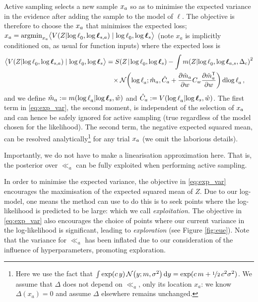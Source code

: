 \documentclass{article} %
\begin{document}
Active sampling selects a new sample $\lfv_a$ so as to minimise the expected variance in the evidence after adding the sample to the model of $\ell$.  The objective is therefore to choose the $\lfv_a$ that minimises the expected loss;
$\lfv_a = \argmin_{\lfv_a} \bigl\langle \cov{\If}{\ll_0,\tvr_{s,a}}\mid \ll_0,\tvr_{s}\bigr\rangle 
$
(note $x_a$ is implicitly conditioned on, as usual for function inputs) where the expected loss is
\begin{align}
\bigl\langle \cov{\If}{\ll_0,\tvr_{s,a}}\mid \ll_0,\tvr_{s}\bigr\rangle 
 & = \secm{\If}{\ll_0,\tvr_s} 
 - \int\mean{\If}{\ll_0,\tvr_{a,s},\Delta_c}^2\nonumber\\
& \hspace{0.3cm}
\times\N{\ll_a}
{\hat{m}_a }
{\hat{C}_a +\pderiv{\hat{m}_a}{w}C_w\pderiv{\hat{m}\tra_a}{w}}
\ud\ll_a\,,\label{eq:exp_var}
\end{align}
and we define
$\hat{m}_a \deq \mean{\ll_a}{\tvr_s,\hat{w}}$
and
$\hat{C}_a \deq \cov{\ll_a}{\tvr_s,\hat{w}}$.
The first term in \eqref{eq:exp_var}, the second moment, is independent of the selection of $\lfv_a$ and can hence  be safely ignored for active sampling (true regardless of the model chosen for the likelihood). 
The second term, the negative expected squared mean, can be resolved analytically\footnote{Here we use the fact that $\int \exp(c\, y)\, \N{y}{m}{\sigma^2} \ud y = \exp(c\, m + \nicefrac{1}{2}\, c^2 \sigma^2)$.  We assume that $\Delta$ does not depend on $\ll_a$, only its location $x_a$: we know $\Delta(x_a) = 0$ and assume $\Delta$ elsewhere remains unchanged.}
 for any trial $\lfv_a$ (we omit the laborious details). 

Importantly, we do not have to make a linearisation approximation here. That is, the \gpb  posterior over $\ll_a$ can be fully exploited when performing active sampling.
%

In order to minimise the expected variance, the objective in \eqref{eq:exp_var} encourages the maximisation of the expected squared mean of $Z$. Due to our log-\gpb model, one means the method can use to do this is to seek points where the log-likelihood is predicted to be large: which we call \emph{exploitation}.  The objective in \eqref{eq:exp_var} also encourages the choice of points where our current variance in the log-likelihood is significant, leading to \emph{exploration} (see Figure \ref{fig:eue}). Note that the variance for $\ll_a$ has been inflated due to our consideration of the influence of hyperparameters, promoting exploration.
\end{document}
